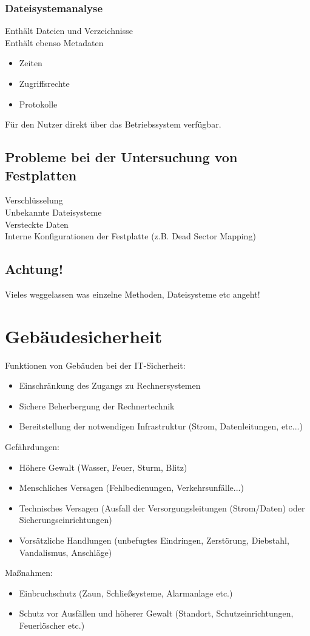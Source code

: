 \documentclass{article} %
\begin{document}
\subsubsection{Dateisystemanalyse}
Enthält Dateien und Verzeichnisse\\
Enthält ebenso Metadaten
\begin{itemize}
	\item Zeiten
    \item Zugriffsrechte
    \item Protokolle
\end{itemize}
Für den Nutzer direkt über das Betriebssystem verfügbar.
\subsection{Probleme bei der Untersuchung von Festplatten}
Verschlüsselung\\
Unbekannte Dateisysteme\\
Versteckte Daten\\
Interne Konfigurationen der Festplatte (z.B. Dead Sector Mapping)\\
\subsection{Achtung!}
Vieles weggelassen was einzelne Methoden, Dateisysteme etc angeht!



\section{Gebäudesicherheit}
Funktionen von Gebäuden bei der IT-Sicherheit:
\begin{itemize}
	\item Einschränkung des Zugangs zu Rechnersystemen
    \item Sichere Beherbergung der Rechnertechnik
    \item Bereitstellung der notwendigen Infrastruktur (Strom, Datenleitungen, etc...)
\end{itemize}
Gefährdungen:
\begin{itemize}
	\item Höhere Gewalt (Wasser, Feuer, Sturm, Blitz)
    \item Menschliches Versagen (Fehlbedienungen, Verkehrsunfälle...)
    \item Technisches Versagen (Ausfall der Versorgungsleitungen (Strom/Daten) oder Sicherungseinrichtungen)
    \item Vorsätzliche Handlungen (unbefugtes Eindringen, Zerstörung, Diebstahl, Vandalismus, Anschläge)
\end{itemize}
Maßnahmen:
\begin{itemize}
	\item Einbruchschutz (Zaun, Schließsysteme, Alarmanlage etc.)
    \item Schutz vor Ausfällen und höherer Gewalt (Standort, Schutzeinrichtungen, Feuerlöscher etc.)
\end{itemize}
\end{document}
